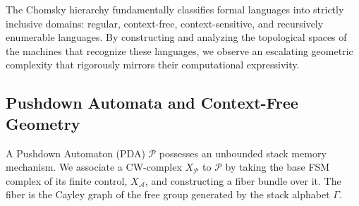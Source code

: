 The Chomsky hierarchy fundamentally classifies formal languages into strictly inclusive domains: regular, context-free, context-sensitive, and recursively enumerable languages. By constructing and analyzing the topological spaces of the machines that recognize these languages, we observe an escalating geometric complexity that rigorously mirrors their computational expressivity.

\subsection{Pushdown Automata and Context-Free Geometry}

\begin{definition}
A Pushdown Automaton (PDA) $\mathcal{P}$ possesses an unbounded stack memory mechanism. We associate a CW-complex $X_\mathcal{P}$ to $\mathcal{P}$ by taking the base FSM complex of its finite control, $X_\mathcal{A}$, and constructing a fiber bundle over it. The fiber is the Cayley graph of the free group generated by the stack alphabet $\Gamma$.
\end{definition}

